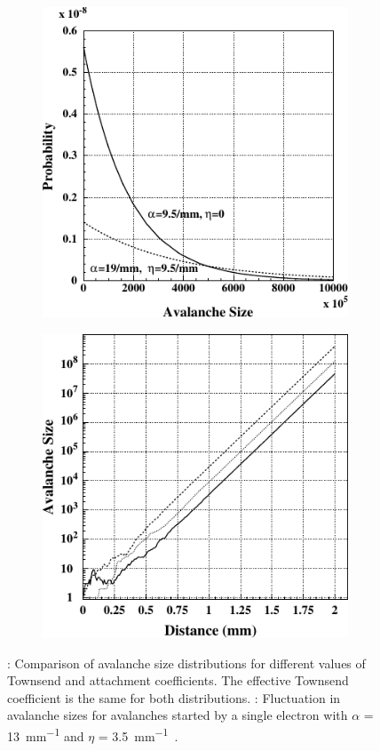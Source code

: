 	\begin{figure}[H]
		\begin{subfigure}{0.5\linewidth}
			\centering
			\includegraphics[width = 0.5\plotwidth]{fig/chapt3/Riegler-distrib.pdf}
			\caption{\label{fig:RVL:A}}
		\end{subfigure}
		\begin{subfigure}{0.5\linewidth}
			\centering
			\includegraphics[width = 0.5\plotwidth]{fig/chapt3/Riegler-fluctuations.pdf}
			\caption{\label{fig:RVL:B}}
		\end{subfigure}
		\caption{\label{fig:RVL} : Comparison of avalanche size distributions for different values of Townsend and attachment coefficients. The effective Townsend coefficient is the same for both distributions. : Fluctuation in avalanche sizes for avalanches started by a single electron with $\alpha$ = \SI{13}{mm^{-1}} and $\eta$ = \SI{3.5}{mm^{-1}}~\cite{RIEGLER2003}.}
	\end{figure}
	
